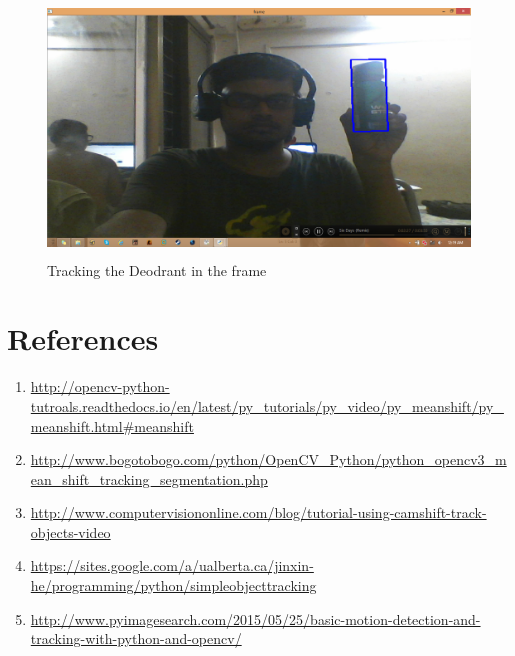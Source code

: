 \documentclass[11pt,a4paper]{article}
\begin{document}
		\begin{figure}[h!]
			\includegraphics[width=0.9\linewidth, height=6.8cm]{../Images/Cam_Det.png}
			\centering
			\caption{Tracking the Deodrant in the frame}
		\end{figure}
	
	\newpage
	\section{References}
		\begin{enumerate}
			\item \url{http://opencv-python-tutroals.readthedocs.io/en/latest/py_tutorials/py_video/py_meanshift/py_meanshift.html#meanshift}
			\item \url{http://www.bogotobogo.com/python/OpenCV_Python/python_opencv3_mean_shift_tracking_segmentation.php}
			\item \url{http://www.computervisiononline.com/blog/tutorial-using-camshift-track-objects-video}
			\item \url{https://sites.google.com/a/ualberta.ca/jinxin-he/programming/python/simpleobjecttracking}
			\item \url{http://www.pyimagesearch.com/2015/05/25/basic-motion-detection-and-tracking-with-python-and-opencv/}
		\end{enumerate}
			
\end{document}
